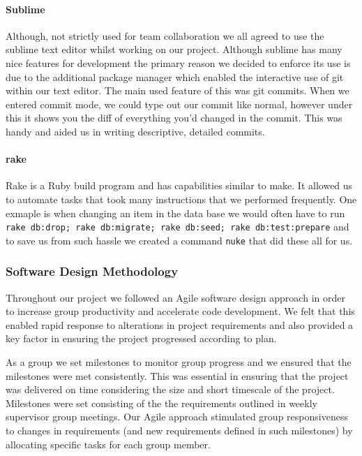     \paragraph{Sublime\cite{sublime}} Although, not strictly used for team collaboration we all agreed to use the sublime text editor whilst working on our project. Although sublime has many nice features for development the primary reason we decided to enforce its use is due to the additional package manager\cite{sublime_pm} which enabled the interactive use of git within our text editor.
    The main used feature of this was git commits. When we entered commit mode, we could type out our commit like normal, however under this it shows you the diff of everything you'd changed in the commit. This was handy and aided us in writing descriptive, detailed commits.

    \paragraph{rake\cite{rake}} Rake is a Ruby build program and has capabilities similar to make. It allowed us to automate tasks that took many instructions that we performed frequently. One exmaple is when changing an item in the data base we would often have to run \verb!rake db:drop; rake db:migrate; rake db:seed; rake db:test:prepare! and to save us from such hassle we created a command \verb!nuke! that did these all for us.

  \subsubsection{Software Design Methodology}
    Throughout our project we followed an Agile software design approach in order to increase group productivity and accelerate code development. We felt that this enabled rapid response to alterations in project requirements and also provided a key factor in ensuring the project progressed according to plan.

    As a group we set milestones to monitor group progress and we ensured that the milestones were met consistently. This was essential in ensuring that the project was delivered on time considering the size and short timescale of the project. Milestones were set consisting of the the requirements outlined in weekly supervisor group meetings. Our Agile approach stimulated group responsiveness to changes in requirements (and new requirements defined in such milestones) by allocating specific tasks for each group member. 

